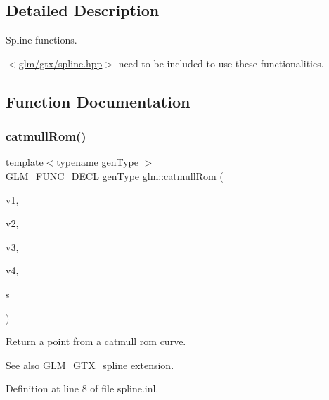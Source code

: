 \subsection{Detailed Description}
Spline functions. 

$<$\mbox{\hyperlink{spline_8hpp}{glm/gtx/spline.\+hpp}}$>$ need to be included to use these functionalities. 

\subsection{Function Documentation}
\mbox{\label{group__gtx__spline_ga8119c04f8210fd0d292757565cd6918d}} 
\subsubsection{\texorpdfstring{catmullRom()}{catmullRom()}}
{\footnotesize\ttfamily template$<$typename gen\+Type $>$ \\
\mbox{\hyperlink{setup_8hpp_ab2d052de21a70539923e9bcbf6e83a51}{G\+L\+M\+\_\+\+F\+U\+N\+C\+\_\+\+D\+E\+CL}} gen\+Type glm\+::catmull\+Rom (\begin{DoxyParamCaption}\item[{gen\+Type const \&}]{v1,  }\item[{gen\+Type const \&}]{v2,  }\item[{gen\+Type const \&}]{v3,  }\item[{gen\+Type const \&}]{v4,  }\item[{typename gen\+Type\+::value\+\_\+type const \&}]{s }\end{DoxyParamCaption})}

Return a point from a catmull rom curve. \begin{DoxySeeAlso}{See also}
\mbox{\hyperlink{group__gtx__spline}{G\+L\+M\+\_\+\+G\+T\+X\+\_\+spline}} extension. 
\end{DoxySeeAlso}


Definition at line 8 of file spline.\+inl.

\mbox{\label{group__gtx__spline_ga6b867eb52e2fc933d2e0bf26aabc9a70}} 
